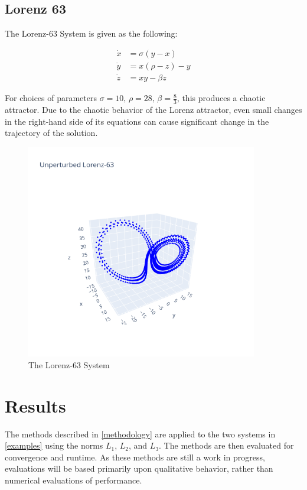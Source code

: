 \documentclass[12pt]{article}
\begin{document}
\subsection{Lorenz 63}

The Lorenz-63 System is given as the following:

\begin{align*}
  \dot{x} &= \sigma (y - x)\\
  \dot{y} &= x ( \rho - z ) - y\\
  \dot{z} &= x y - \beta z
\end{align*}

For choices of parameters $\sigma=10,\, \rho=28,\, \beta=\frac{8}{3}$, this produces a chaotic attractor. Due to the chaotic behavior of the Lorenz attractor, even small changes in the right-hand side of its equations can cause significant change in the trajectory of the solution.

\begin{figure}[ht]
  \centering
  \includegraphics[width=0.9\textwidth]{lorenz-unperturbed.png}
  \caption{The Lorenz-63 System}
\end{figure}




\section{Results}

The methods described in \ref{methodology} are applied to the two systems in \ref{examples} using the norms $L_1$, $L_2$, and $L_3$. The methods are then evaluated for convergence and runtime. As these methods are still a work in progress, evaluations will be based primarily upon qualitative behavior, rather than numerical evaluations of performance.
\end{document}
